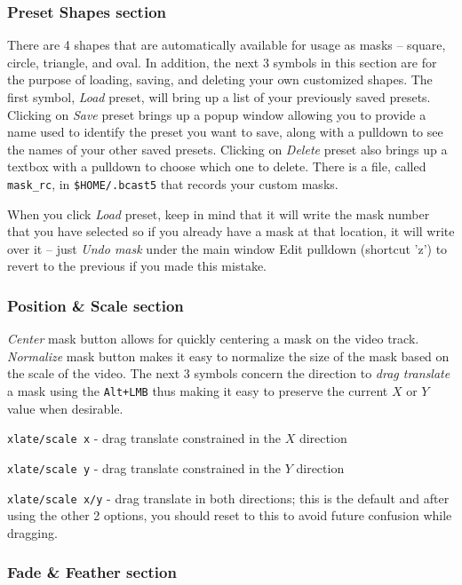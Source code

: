 \subsubsection*{Preset Shapes section}%
\label{ssub:preset_shape_section}

There are 4 shapes that are automatically available for usage as masks – square, circle, triangle, and oval.  In addition, the next 3 symbols in this section are for the purpose of loading, saving, and deleting your own customized shapes.  The first symbol, \textit{Load} preset, will bring up a list of your previously saved presets.  Clicking on \textit{Save} preset brings up a popup window allowing you to provide a name used to identify the preset you want to save, along with a pulldown to see the names of your other saved presets.   Clicking on \textit{Delete} preset also brings up a textbox with a pulldown to choose which one to delete.  There is a file, called \texttt{mask\_rc}, in \texttt{\$HOME/.bcast5} that records your custom masks.  

When you click \textit{Load} preset, keep in mind that it will write the mask number that you have selected so if you already have a mask at that location, it will write over it – just \textit{Undo mask} under the main window Edit pulldown (shortcut 'z') to revert to the previous if you made this mistake.

\subsubsection*{Position \& Scale section}%
\label{ssub:position_scale_section}

\textit{Center} mask button allows for quickly centering a mask on the video track. 
\textit{Normalize} mask button makes it easy to normalize the size of the mask based on the scale of the video. 
The next 3 symbols concern the direction to \textit{drag translate} a mask using the \texttt{Alt+LMB} thus making it easy to preserve the current $X$ or $Y$ value when desirable.

\texttt{xlate/scale x}	- drag translate constrained in the $X$ direction

\texttt{xlate/scale y}	- drag translate constrained in the $Y$ direction

\texttt{xlate/scale x/y}	- drag translate in both directions; this is the default and after using the other 2 options, you should reset to this to avoid future confusion while dragging.

\subsubsection*{Fade \& Feather section}%
\label{ssub:fade_feather_section}

